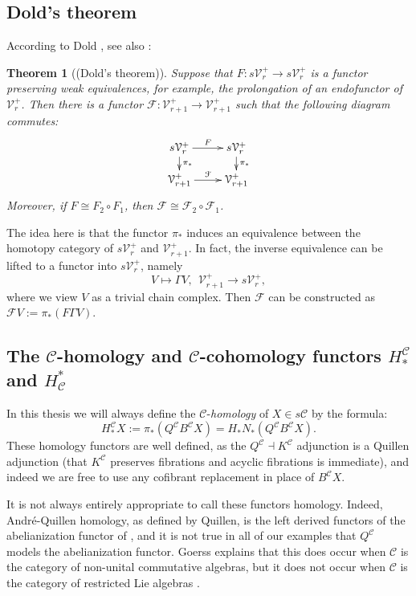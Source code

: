 \documentclass[11pt]{amsart} \renewcommand{\baselinestretch}{1.4}
\theoremstyle{plain}
\newtheorem{thm}{Theorem}[section]
\theoremstyle{definition}
\renewcommand{\to}{\longrightarrow}
\newcommand{\calF}{\mathcal{F}}
\newcommand{\calV}{\mathcal{V}}
\newcommand{\calc}{\mathcal{C}}
\newcommand{\citeBOX}[2][]{\cite[\mbox{#1}]{#2}}
\newcommand{\vect}[2]{\calV^{#1}_{#2}}
\renewcommand{\mapsto}{\longmapsto}
\begin{document}
\begin{Conventions and notation}
\subsection{Dold's theorem}
According to Dold \cite{DoldHomologySPs.pdf}, see also \citeBOX[Lemma 3.1]{ChingUnpublished}: 
\begin{thm}[(Dold's theorem)]
\label{Dold's theorem}
Suppose that $F:s\vect{+}{r}\to s\vect{+}{r}$ is a functor preserving weak equivalences, for example, the prolongation of an endofunctor of $\vect{+}{r}$. Then there is a functor $\calF:\vect{+}{r+1}\to\vect{+}{r+1}$ such that the following diagram commutes:
\[\xymatrix@R=4mm{
s\vect{+}{r}\ar[r]^-{F}
\ar[d]^-{\pi_*}
&%
s\vect{+}{r}\ar[d]^-{\pi_*}
\\%
\vect{+}{r+1}\ar[r]^-{\calF}
&
\vect{+}{r+1}
}\]
Moreover, if $F\cong {F}_2\circ {F}_1$, then $\calF\cong {\calF}_2\circ {\calF}_1$.
\end{thm}
\noindent The idea here is that the functor $\pi_*$ induces an equivalence between the homotopy category of $s\vect{+}{r}$ and $\vect{+}{r+1}$. In fact, the inverse equivalence can be lifted to a functor into $s\vect{+}{r}$, namely 
\[V\mapsto \Gamma V,\ \ \vect{+}{r+1}\to s\vect{+}{r},\]
where we view $V$ as a trivial chain complex. Then $\calF$ can be constructed as $\calF V:=\pi_*(F\Gamma V)$.


\subsection{The $\calc$-homology and $\calc$-cohomology functors $H^{\calc}_*$ and $H_{\calc}^*$}



In this thesis we will always define the $\calc$-\emph{homology} of $X\in s\calc$ by the formula:
\[H_*^{\calc}X:=\pi_*(Q^\calc B^\calc X)=H_*N_*(Q^\calc B^\calc X).\]
These homology functors are well defined, as the $Q^\calc\dashv K^\calc$ adjunction is a Quillen adjunction (that $K^\calc$ preserves fibrations and acyclic fibrations is immediate), and indeed we are free to use any cofibrant replacement in place of $B^\calc X$.

It is not always entirely appropriate to call these functors homology. Indeed, Andr\'e-Quillen homology, as defined by Quillen, is the left derived functors of the abelianization functor of \citeBOX[\S II.5]{QuillenHomAlg.pdf}, and it is not true in all of our examples that $Q^\calc$ models the abelianization functor. Goerss \citeBOX[\S4]{MR1089001} explains that this does occur when $\calc$ is the category of non-unital commutative algebras, but it does not occur when $\calc$ is the category of restricted Lie algebras \cite{MR2025911}.


\end{Conventions and notation}
\end{document}
